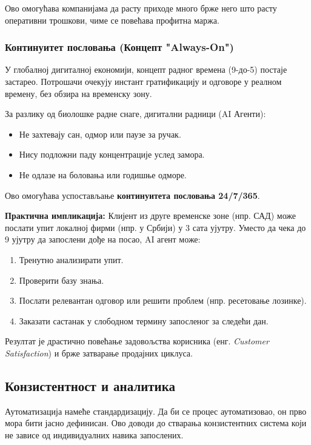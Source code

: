 Ово омогућава компанијама да расту приходе много брже него што расту оперативни трошкови, чиме се повећава профитна маржа.

\subsubsection{Континуитет пословања (Концепт "Always-On")}

У глобалној дигиталној економији, концепт радног времена (9-до-5) постаје застарео. Потрошачи очекују инстант гратификацију и одговоре у реалном времену, без обзира на временску зону.

За разлику од биолошке радне снаге, дигитални радници (AI Агенти):
\begin{itemize}
    \item Не захтевају сан, одмор или паузе за ручак.
    \item Нису подложни паду концентрације услед замора.
    \item Не одлазе на боловања или годишње одморе.
\end{itemize}

Ово омогућава успостављање \textbf{континуитета пословања 24/7/365}.

\textbf{Практична импликација:}
Клијент из друге временске зоне (нпр. САД) може послати упит локалној фирми (нпр. у Србији) у 3 сата ујутру. Уместо да чека до 9 ујутру да запослени дође на посао, AI агент може:
\begin{enumerate}
    \item Тренутно анализирати упит.
    \item Проверити базу знања.
    \item Послати релевантан одговор или решити проблем (нпр. ресетовање лозинке).
    \item Заказати састанак у слободном термину запосленог за следећи дан.
\end{enumerate}

Резултат је драстично повећање задовољства корисника (енг. \textit{Customer Satisfaction}) и брже затварање продајних циклуса.


\subsection{Конзистентност и аналитика}

Аутоматизација намеће стандардизацију. Да би се процес аутоматизовао, он прво мора бити јасно дефинисан. Ово доводи до стварања конзистентних система који не зависе од индивидуалних навика запослених.

